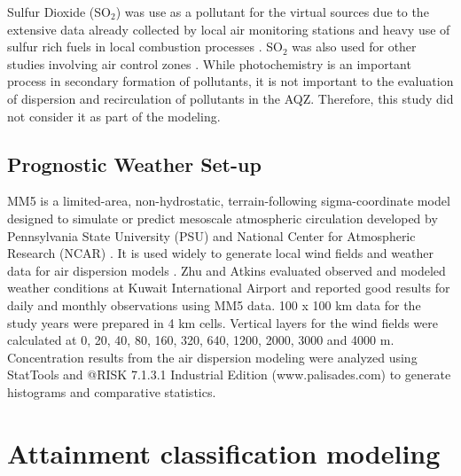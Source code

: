 Sulfur Dioxide (SO$_{2}$) was use as a pollutant for the virtual sources due to the extensive data already collected by local air monitoring stations and heavy use of sulfur rich fuels in local combustion processes \citep{Al-Awadhi2014, Al-Rashidi2005}.  SO$_{2}$ was also used for other studies involving air control zones \citep{Hao2000, Henschel2013, Pereira2007}.  While photochemistry is an important process in secondary formation of pollutants, it is not important to the evaluation of dispersion and recirculation of pollutants in the AQZ.  Therefore, this study did not consider it as part of the modeling. 

\subsection{Prognostic Weather Set-up}

MM5 is a limited-area, non-hydrostatic, terrain-following sigma-coordinate model designed to simulate or predict mesoscale atmospheric circulation developed by Pennsylvania State University (PSU) and National Center for Atmospheric Research (NCAR) \citep{Grell1994}.  It is used widely to generate local wind fields and weather data for air dispersion models \citep{Ghannam2013a, Lee2009, Tsai2011, Zhu2004}.  Zhu and Atkins evaluated observed and modeled weather conditions at Kuwait International Airport and reported good results for daily and monthly observations using MM5 data.  100 x 100 km data for the study years were prepared in 4 km cells. Vertical layers for the wind fields were calculated at 0, 20, 40, 80, 160, 320, 640, 1200, 2000, 3000 and 4000 m. Concentration results from the air dispersion modeling were analyzed using StatTools and @RISK 7.1.3.1 Industrial Edition (www.palisades.com) to generate histograms and comparative statistics. 

\section{Attainment classification modeling}

